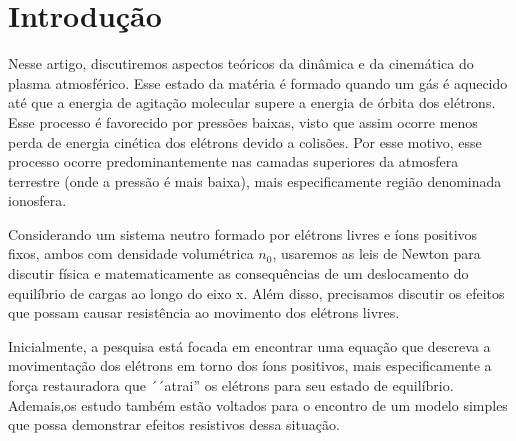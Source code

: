 \documentclass[
	article,
	11pt,
	oneside,
	a4paper,
	english,
	brazil,
	sumario=tradicional
	]{abntex2}
\begin{document}
\frenchspacing


\textual
\section{Introdução}

Nesse artigo, discutiremos aspectos teóricos da dinâmica e da cinemática do plasma atmosférico. Esse estado da matéria é formado quando um gás é aquecido até que a energia de agitação molecular supere a energia de órbita dos elétrons. Esse processo é favorecido por pressões baixas, visto que assim ocorre menos perda de energia cinética dos elétrons devido a colisões. Por esse motivo, esse processo ocorre predominantemente nas camadas superiores da atmosfera terrestre (onde a pressão é mais baixa), mais especificamente região denominada ionosfera.

Considerando um sistema neutro formado por elétrons livres e íons positivos fixos, ambos com densidade volumétrica $n_0$, usaremos as leis de Newton para discutir física e matematicamente as consequências de um deslocamento do equilíbrio de cargas ao longo do eixo x. Além disso, precisamos discutir os efeitos que possam causar resistência ao movimento dos elétrons livres.

Inicialmente, a pesquisa está focada em encontrar uma equação que descreva a movimentação dos elétrons em torno dos íons positivos, mais especificamente a força restauradora que ´´atrai'' os elétrons para seu estado de equilíbrio. Ademais,os estudo também estão voltados para o encontro de um modelo simples que possa demonstrar efeitos resistivos dessa situação.
\end{document}
